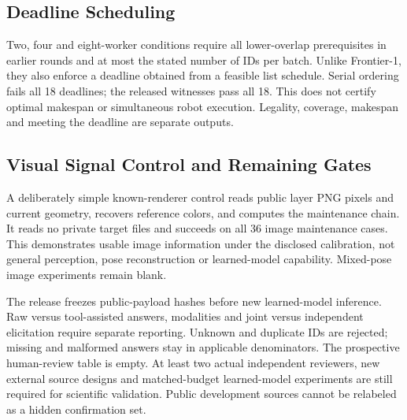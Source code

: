 \subsection{Deadline Scheduling}
Two, four and eight-worker conditions require all lower-overlap
prerequisites in earlier rounds and at most the stated number of IDs
per batch. Unlike Frontier-1, they also enforce a deadline obtained
from a feasible list schedule. Serial ordering fails all 18 deadlines;
the released witnesses pass all 18. This does not certify optimal
makespan or simultaneous robot execution. Legality, coverage, makespan
and meeting the deadline are separate outputs.

\subsection{Visual Signal Control and Remaining Gates}
A deliberately simple known-renderer control reads public layer PNG
pixels and current geometry, recovers reference colors, and computes
the maintenance chain. It reads no private target files and succeeds
on all 36 image maintenance cases. This demonstrates usable image
information under the disclosed calibration, not general perception,
pose reconstruction or learned-model capability. Mixed-pose image
experiments remain blank.

The release freezes public-payload hashes before new learned-model
inference. Raw versus tool-assisted answers, modalities and joint versus
independent elicitation require separate reporting. Unknown and duplicate
IDs are rejected; missing and malformed answers stay in applicable
denominators. The prospective human-review table is empty. At least
two actual independent reviewers, new external source designs and
matched-budget learned-model experiments are still required for
scientific validation. Public development sources cannot be relabeled
as a hidden confirmation set.
